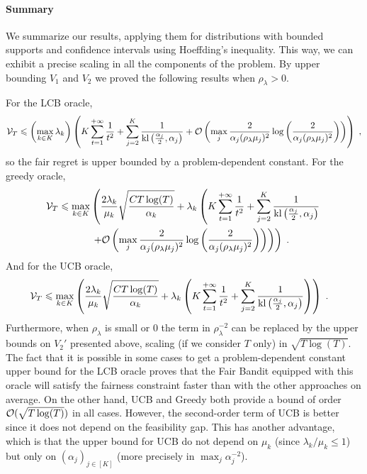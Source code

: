 \paragraph{Summary} We summarize our results, applying them for distributions with bounded supports and confidence intervals using Hoeffding's inequality. This way, we can exhibit a precise scaling in all the components of the problem. By upper bounding $V_1$ and $V_2$ we proved the following results when $\rho_\lambda>0$. 

For the LCB oracle,
	\[\mathcal{V}_T \leqslant \left(\max_{k \in K}\lambda_k\right) \left( K \sum_{t=1}^{+\infty} \frac{1}{t^2} + \sum_{j=2}^K\frac{1}{\text{\normalfont kl}\left(\frac{\alpha_j}{2}, \alpha_j\right)} + \mathcal{O}\left(\max_j\frac{2}{\alpha_j(\rho_\lambda \mu_j)^2}\log\left(\frac{2}{\alpha_j(\rho_\lambda \mu_j)^2}\right)\right)\right) \;, \]
so the fair regret is upper bounded by a problem-dependent constant. For the greedy oracle, 
	\begin{align*} \mathcal{V}_T \leqslant \max_{k\in K} &\left(\frac{2\lambda_k}{\mu_k}\sqrt{\frac{C T \log(T)}{\alpha_k}}+ \lambda_k\left(K \sum_{t=1}^{+\infty} \frac{1}{t^2} + \sum_{j=2}^K\frac{1}{\text{\normalfont kl}\left(\frac{\alpha_j}{2}, \alpha_j\right)} \right.\right. \\
	& \left.\left. + \mathcal{O}\left(\max_j\frac{2}{\alpha_j(\rho_\lambda \mu_j)^2}\log\left(\frac{2}{\alpha_j(\rho_\lambda \mu_j)^2}\right)\right)\right)\right) \;. \end{align*}
And for the UCB oracle, 
		\begin{align*} \mathcal{V}_T \leqslant \max_{k\in K} &\left(\frac{2\lambda_k}{\mu_k}\sqrt{\frac{C T \log(T)}{\alpha_k}}+ \lambda_k\left(K \sum_{t=1}^{+\infty} \frac{1}{t^2} + \sum_{j=2}^K\frac{1}{\text{\normalfont kl}\left(\frac{\alpha_j}{2}, \alpha_j\right)}\right)\right) \;. \end{align*}
Furthermore, when $\rho_\lambda$ is small or $0$ the term in $\rho_\lambda^{-2}$ can be replaced by the upper bounds on $V_2'$ presented above, scaling (if we consider $T$ only) in $\sqrt{T\log(T)}$. The fact that it is possible in some cases to get a problem-dependent constant upper bound for the LCB oracle proves that the Fair Bandit equipped with this oracle will satisfy the fairness constraint faster than with the other approaches on average. On the other hand, UCB and Greedy both provide a bound of order $\mathcal{O}(\sqrt{T\log(T)})$ in all cases. However, the second-order term of UCB is better since it does not depend on the feasibility gap. This has another advantage, which is that the upper bound for UCB do not depend on $\mu_k$ (since $\lambda_k/\mu_k \leq 1$) but only on $(\alpha_j)_{j \in [K]}$ (more precisely in $\max_j \alpha_j^{-2}$).

